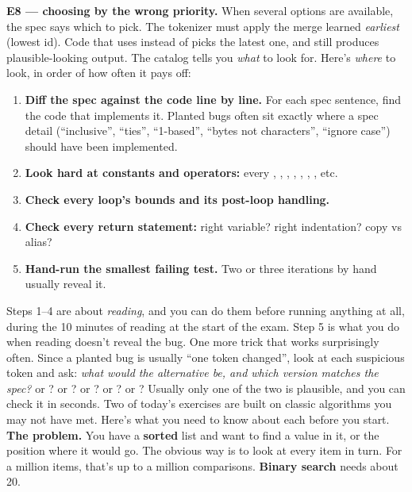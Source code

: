 \documentclass[10pt,a4paper]{article}
\begin{document}
\textbf{E8 — choosing by the wrong priority.} When several options are available, the spec says which to pick. The tokenizer must apply the merge learned \emph{earliest} (lowest id). Code that uses  instead of  picks the latest one, and still produces plausible-looking output.
The catalog tells you \emph{what} to look for. Here’s \emph{where} to look, in order of how often it pays off:
\begin{enumerate}
\item \textbf{Diff the spec against the code line by line.} For each spec sentence, find the code that implements it. Planted bugs often sit exactly where a spec detail (“inclusive”, “ties”, “1-based”, “bytes not characters”, “ignore case”) should have been implemented.
\item \textbf{Look hard at constants and operators:} every , , , , \code{\textless{}\allowbreak{}}, \code{\textless{}\allowbreak{}=\allowbreak{}}, ,  etc.
\item \textbf{Check every loop’s bounds and its post-loop handling.}
\item \textbf{Check every return statement:} right variable? right indentation? copy vs alias?
\item \textbf{Hand-run the smallest failing test.} Two or three iterations by hand usually reveal it.
\end{enumerate}
Steps 1–4 are about \emph{reading}, and you can do them before running anything at all, during the 10 minutes of reading at the start of the exam. Step 5 is what you do when reading doesn’t reveal the bug.
One more trick that works surprisingly often. Since a planted bug is usually “one token changed”, look at each suspicious token and ask: \emph{what would the alternative be, and which version matches the spec?} \code{\textless{}\allowbreak{}} or \code{\textless{}\allowbreak{}=\allowbreak{}}?  or ?  or ?  or ?  or ? Usually only one of the two is plausible, and you can check it in seconds.
Two of today’s exercises are built on classic algorithms you may not have met. Here’s what you need to know about each before you start.
\textbf{The problem.} You have a \textbf{sorted} list and want to find a value in it, or the position where it would go. The obvious way is to look at every item in turn. For a million items, that’s up to a million comparisons. \textbf{Binary search} needs about 20.
\end{document}
